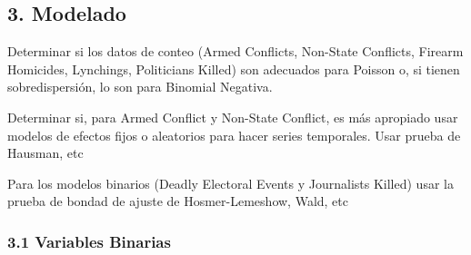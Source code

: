\documentclass[
  11pt,
]{article}
\newenvironment{Shaded}{\begin{snugshade}}{\end{snugshade}}
\newcommand{\AttributeTok}[1]{\textcolor[rgb]{0.13,0.29,0.53}{#1}}
\newcommand{\DecValTok}[1]{\textcolor[rgb]{0.00,0.00,0.81}{#1}}
\newcommand{\FunctionTok}[1]{\textcolor[rgb]{0.13,0.29,0.53}{\textbf{#1}}}
\newcommand{\NormalTok}[1]{#1}
\newcommand{\OtherTok}[1]{\textcolor[rgb]{0.56,0.35,0.01}{#1}}
\newcommand{\SpecialCharTok}[1]{\textcolor[rgb]{0.81,0.36,0.00}{\textbf{#1}}}
\newcommand{\StringTok}[1]{\textcolor[rgb]{0.31,0.60,0.02}{#1}}
\begin{document}
\subsection{3. Modelado}\label{modelado}

Determinar si los datos de conteo (Armed Conflicts, Non-State Conflicts,
Firearm Homicides, Lynchings, Politicians Killed) son adecuados para
Poisson o, si tienen sobredispersión, lo son para Binomial Negativa.

Determinar si, para Armed Conflict y Non-State Conflict, es más
apropiado usar modelos de efectos fijos o aleatorios para hacer series
temporales. Usar prueba de Hausman, etc

Para los modelos binarios (Deadly Electoral Events y Journalists Killed)
usar la prueba de bondad de ajuste de Hosmer-Lemeshow, Wald, etc

\subsubsection{3.1 Variables Binarias}\label{variables-binarias}

\begin{Shaded}
\end{Shaded}
\end{document}
